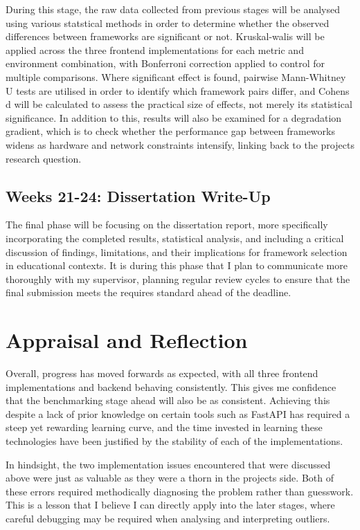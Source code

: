 \documentclass[conference]{IEEEtran}
\begin{document}
During this stage, the raw data collected from previous stages will be analysed using various statstical methods in order to determine whether the observed differences between frameworks are significant or not. Kruskal-walis will be applied across the three frontend implementations for each metric and environment combination, with Bonferroni correction applied to control for multiple comparisons. Where significant effect is found, pairwise Mann-Whitney U tests are utilised in order to identify which framework pairs differ, and Cohens d will be calculated to assess the practical size of effects, not merely its statistical significance. In addition to this, results will also be examined for a degradation gradient, which is to check whether the performance gap between frameworks widens as hardware and network constraints intensify, linking back to the projects research question. 

\medskip

\subsection{Weeks 21-24: Dissertation Write-Up}

The final phase will be focusing on the dissertation report, more specifically incorporating the completed results, statistical analysis, and including a critical discussion of findings, limitations, and their implications for framework selection in educational contexts. It is during this phase that I plan to communicate more thoroughly with my supervisor, planning regular review cycles to ensure that the final submission meets the requires standard ahead of the deadline. 

\section{Appraisal and Reflection}

Overall, progress has moved forwards as expected, with all three frontend implementations and backend behaving consistently. This gives me confidence that the benchmarking stage ahead will also be as consistent. Achieving this despite a lack of prior knowledge on certain tools such as FastAPI has required a steep yet rewarding learning curve, and the time invested in learning these technologies have been justified by the stability of each of the implementations.

\medskip

In hindsight, the two implementation issues encountered that were discussed above were just as valuable as they were a thorn in the projects side. Both of these errors required methodically diagnosing the problem rather than guesswork. This is a lesson that I believe I can directly apply into the later stages, where careful debugging may be required when analysing and interpreting outliers. 
\end{document}
